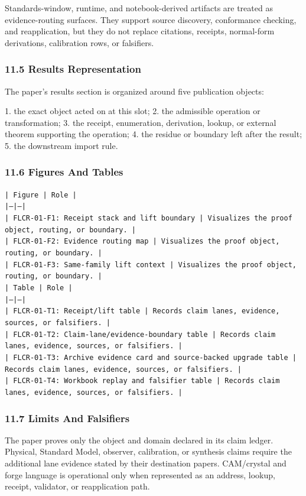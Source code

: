 \documentclass[11pt]{article}
\begin{document}
Standards-window, runtime, and notebook-derived artifacts are treated
as evidence-routing surfaces. They support source discovery, conformance
checking, and reapplication, but they do not replace citations, receipts,
normal-form derivations, calibration rows, or falsifiers.

\subsubsection*{11.5 Results Representation}

The paper's results section is organized around five publication objects:

1. the exact object acted on at this slot;
2. the admissible operation or transformation;
3. the receipt, enumeration, derivation, lookup, or external theorem supporting
   the operation;
4. the residue or boundary left after the result;
5. the downstream import rule.

\subsubsection*{11.6 Figures And Tables}

\noindent\texttt{| Figure | Role |}\\
\noindent\texttt{|---|---|}\\
\noindent\texttt{| FLCR-01-F1: Receipt stack and lift boundary | Visualizes the proof object, routing, or boundary. |}\\
\noindent\texttt{| FLCR-01-F2: Evidence routing map | Visualizes the proof object, routing, or boundary. |}\\
\noindent\texttt{| FLCR-01-F3: Same-family lift context | Visualizes the proof object, routing, or boundary. |}\\

\noindent\texttt{| Table | Role |}\\
\noindent\texttt{|---|---|}\\
\noindent\texttt{| FLCR-01-T1: Receipt/lift table | Records claim lanes, evidence, sources, or falsifiers. |}\\
\noindent\texttt{| FLCR-01-T2: Claim-lane/evidence-boundary table | Records claim lanes, evidence, sources, or falsifiers. |}\\
\noindent\texttt{| FLCR-01-T3: Archive evidence card and source-backed upgrade table | Records claim lanes, evidence, sources, or falsifiers. |}\\
\noindent\texttt{| FLCR-01-T4: Workbook replay and falsifier table | Records claim lanes, evidence, sources, or falsifiers. |}\\

\subsubsection*{11.7 Limits And Falsifiers}

The paper proves only the object and domain declared in its claim ledger.
Physical, Standard Model, observer, calibration, or synthesis claims require
the additional lane evidence stated by their destination papers. CAM/crystal
and forge language is operational only when represented as an address, lookup,
receipt, validator, or reapplication path.
\end{document}
